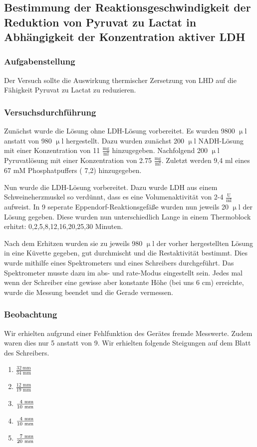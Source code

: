 \documentclass{scrartcl}
\begin{document}
\subsection{Bestimmung der Reaktionsgeschwindigkeit der Reduktion von Pyruvat zu Lactat in Abhängigkeit der Konzentration aktiver LDH}
\subsubsection{Aufgabenstellung}
Der Versuch sollte die Auswirkung thermischer Zersetzung von LHD auf die Fähigkeit Pyruvat zu Lactat zu reduzieren.
\subsubsection{Versuchsdurchführung}
Zunächst wurde die Lösung ohne LDH-Lösung vorbereitet. Es wurden 9800 $\upmu$l anstatt von 980 $\upmu$l hergestellt. Dazu wurden zunächst 200 $\upmu$l NADH-Lösung mit einer Konzentration von 11 $\frac{\text{mg}}{\text{ml}}$ hinzugegeben. Nachfolgend 200 $\upmu$l Pyruvatlösung mit einer Konzentration von 2.75 $\frac{\text{mg}}{\text{ml}}$. Zuletzt werden 9,4 ml eines 67 mM Phosphatpuffers ( 7,2) hinzugegeben.

Nun wurde die LDH-Lösung vorbereitet. Dazu wurde LDH aus einem Schweineherzmuskel so verdünnt, dass es eine Volumenaktivität von 2-4 $\frac{\text{U}}{\text{ml}}$ aufweist. In 9 seperate Eppendorf-Reaktionsgefäße wurden nun jeweils 20 $\upmu$l der Lösung gegeben. Diese wurden nun unterschiedlich Lange in einem Thermoblock erhitzt: 0,2,5,8,12,16,20,25,30 Minuten.

Nach dem Erhitzen wurden sie zu jeweils 980 $\upmu$l der vorher hergestellten Lösung in eine Küvette gegeben, gut durchmischt und die Restaktivität bestimmt. Dies wurde mithilfe eines Spektrometers und eines Schreibers durchgeführt. Das Spektrometer musste dazu im abs- und rate-Modus eingestellt sein. Jedes mal wenn der Schreiber eine gewisse aber konstante Höhe (bei uns 6 cm) erreichte, wurde die Messung beendet und die Gerade vermessen.
\subsubsection{Beobachtung}
Wir erhielten aufgrund einer Fehlfunktion des Gerätes fremde Messwerte. Zudem waren dies nur 5 anstatt von 9.
Wir erhielten folgende Steigungen auf dem Blatt des Schreibers.
\begin{enumerate}
	\item $\frac{32 ~\text{mm}}{34\text{ mm}}$
	\item $\frac{12\text{ mm}}{19\text{ mm}}$
	\item $\frac{\hfill 4\text{ mm}}{10\text{ mm}}$
	\item $\frac{\hfill 4\text{ mm}}{10 \text{ mm}}$
	\item $\frac{\hfill 7\text{ mm}}{20\text{ mm}}$
\end{enumerate}
\end{document}
